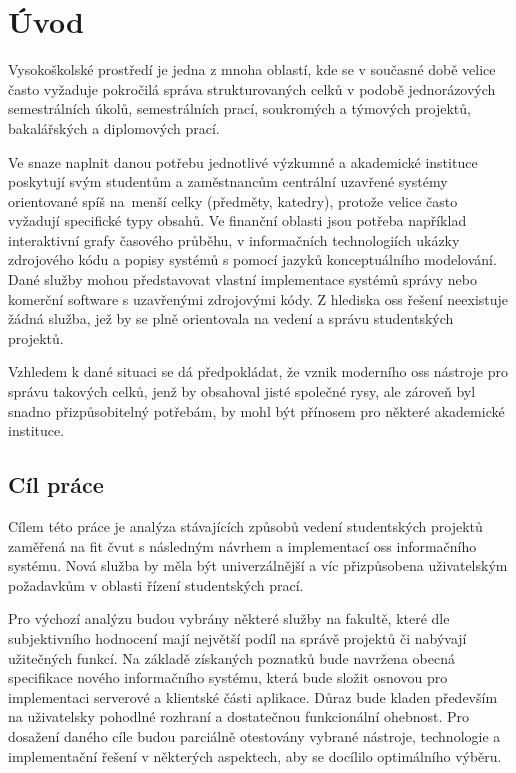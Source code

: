 \chapter{Úvod}

Vysokoškolské prostředí je jedna z mnoha oblastí, kde se v současné době velice často vyžaduje pokročilá správa strukturovaných celků v podobě jednorázových semestrálních úkolů, semestrálních prací, soukromých a týmových projektů, bakalářských a diplomových prací.

Ve snaze naplnit danou potřebu jednotlivé výzkumné a akademické instituce poskytují svým studentům a zaměstnancům centrální uzavřené systémy orientované spíš na~menší celky (předměty, katedry), protože velice často vyžadují specifické typy obsahů. Ve finanční oblasti jsou potřeba například interaktivní grafy časového průběhu, v informačních technologiích ukázky zdrojového kódu a popisy systémů s pomocí jazyků konceptuálního modelování. Dané služby mohou představovat vlastní implementace systémů správy nebo komerční software s uzavřenými zdrojovými kódy. Z hlediska \gls{oss} řešení neexistuje žádná služba, jež by se plně orientovala na vedení a správu studentských projektů.

Vzhledem k dané situaci se dá předpokládat, že vznik moderního \gls{oss} nástroje pro správu takových celků, jenž by obsahoval jisté společné rysy, ale zároveň byl snadno přizpůsobitelný potřebám, by mohl být přínosem pro některé akademické instituce.



\clearpage
\section{Cíl práce}

Cílem této práce je analýza stávajících způsobů vedení studentských projektů zaměřená na \gls{fit} \gls{čvut} s následným návrhem a implementací \gls{oss} informačního systému. Nová služba by měla být univerzálnější a víc přizpůsobena uživatelským požadavkům v oblasti řízení studentských prací.

Pro výchozí analýzu budou vybrány některé služby na fakultě, které dle subjektivního hodnocení mají největší podíl na správě projektů či nabývají užitečných funkcí. Na základě získaných poznatků bude navržena obecná specifikace nového informačního systému, která bude složit osnovou pro implementaci serverové a klientské části aplikace. Důraz bude kladen především na uživatelsky pohodlné rozhraní a dostatečnou funkcionální ohebnost. Pro dosažení daného cíle budou parciálně otestovány vybrané nástroje, technologie a implementační řešení v některých aspektech, aby se docílilo optimálního výběru.

